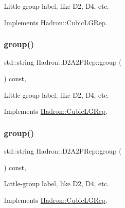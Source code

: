 Little-\/group label, like D2, D4, etc. 

Implements \mbox{\hyperlink{structHadron_1_1CubicLGRep_a9bdb14b519a611d21379ed96a3a9eb41}{Hadron\+::\+Cubic\+L\+G\+Rep}}.

\mbox{\label{structHadron_1_1D2A2PRep_a4268c85ec8e19cbb8d02a4ff1fe784c0}} 
\subsubsection{\texorpdfstring{group()}{group()}\hspace{0.1cm}{\footnotesize\ttfamily [2/3]}}
{\footnotesize\ttfamily std\+::string Hadron\+::\+D2\+A2\+P\+Rep\+::group (\begin{DoxyParamCaption}{ }\end{DoxyParamCaption}) const\hspace{0.3cm}{\ttfamily [inline]}, {\ttfamily [virtual]}}

Little-\/group label, like D2, D4, etc. 

Implements \mbox{\hyperlink{structHadron_1_1CubicLGRep_a9bdb14b519a611d21379ed96a3a9eb41}{Hadron\+::\+Cubic\+L\+G\+Rep}}.

\mbox{\label{structHadron_1_1D2A2PRep_a4268c85ec8e19cbb8d02a4ff1fe784c0}} 
\subsubsection{\texorpdfstring{group()}{group()}\hspace{0.1cm}{\footnotesize\ttfamily [3/3]}}
{\footnotesize\ttfamily std\+::string Hadron\+::\+D2\+A2\+P\+Rep\+::group (\begin{DoxyParamCaption}{ }\end{DoxyParamCaption}) const\hspace{0.3cm}{\ttfamily [inline]}, {\ttfamily [virtual]}}

Little-\/group label, like D2, D4, etc. 

Implements \mbox{\hyperlink{structHadron_1_1CubicLGRep_a9bdb14b519a611d21379ed96a3a9eb41}{Hadron\+::\+Cubic\+L\+G\+Rep}}.

\mbox{\label{structHadron_1_1D2A2PRep_a6138d8ba45477135957914c53d06a44e}} 
